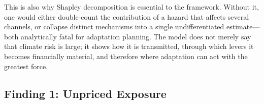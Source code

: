 \begin{twocolbody}
This is also why Shapley decomposition is essential to the framework. Without it, one would either double-count the contribution of a hazard that affects several channels, or collapse distinct mechanisms into a single undifferentiated estimate---both analytically fatal for adaptation planning. The model does not merely say that climate risk is large; it shows how it is transmitted, through which levers it becomes financially material, and therefore where adaptation can act with the greatest force.

\end{twocolbody}

\clearpage\thispagestyle{chapterstart}

{\color{SEGreen}\subsection*{Finding 1: Unpriced Exposure}\label{toc:f1}}
\greensep

